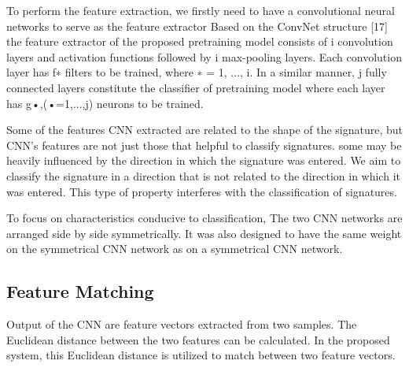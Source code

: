 \documentclass[runningheads]{llncs}
\begin{document}
To perform the feature extraction, we firstly need to have a convolutional neural networks  to serve as the feature extractor
Based on the ConvNet structure [17] the feature extractor of the proposed pretraining model consists of i convolution layers and activation functions followed by i max-pooling layers. Each convolution layer has f∗ filters to be trained, where ∗ = 1, ..., i. In a similar manner, j fully connected layers constitute the classifier of pretraining model where each layer has g•,(•=1,...,j) neurons to be trained. 


Some of the features CNN extracted are related to the shape of the signature, but CNN's features are not just those that helpful to classify signatures.
some may be heavily influenced by the direction in which the signature was entered.
We aim to classify the signature in a direction that is not related to the direction in which it was entered. This type of property interferes with the classification of signatures.

To focus on characteristics conducive to classification, The two CNN networks are arranged side by side symmetrically.
It was also designed to have the same weight on the symmetrical CNN network as on a symmetrical CNN network. %







\subsection{Feature Matching}
Output of the CNN are feature vectors extracted from two samples. The Euclidean distance between the two features can be calculated.
In the proposed system, this Euclidean distance is utilized to match between two feature vectors.
\end{document}
